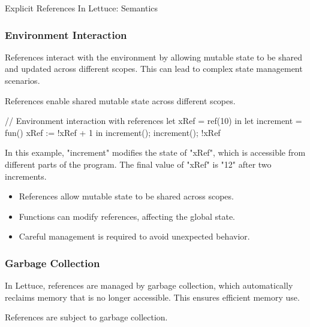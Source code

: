 \begin{notes}{Explicit References In Lettuce: Semantics}
\begin{highlight}
    \end{highlight}
    
    \subsubsection*{Environment Interaction}
    
    References interact with the environment by allowing mutable state to be shared and updated across different scopes. This can lead to complex state management scenarios.
    
    \begin{highlight}
    
        References enable shared mutable state across different scopes.
    
    \begin{code}[Lettuce]
    // Environment interaction with references
    let xRef = ref(10) in
    let increment = fun() {
        xRef := !xRef + 1
    } in
    increment(); increment(); !xRef
    \end{code}
    
        In this example, "increment" modifies the state of "xRef", which is accessible from different parts of the program. The final value of "xRef" is "12" after two increments.
    
        \begin{itemize}
            \item References allow mutable state to be shared across scopes.
            \item Functions can modify references, affecting the global state.
            \item Careful management is required to avoid unexpected behavior.
        \end{itemize}
    
    \end{highlight}
    
    \subsubsection*{Garbage Collection}
    
    In Lettuce, references are managed by garbage collection, which automatically reclaims memory that is no longer accessible. This ensures efficient memory use.
    
    \begin{highlight}
    
        References are subject to garbage collection.
    

\end{highlight}
\end{notes}
